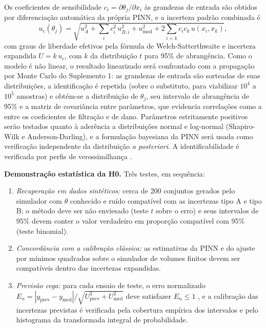 \documentclass[11pt,a4paper]{article}
\begin{document}
\noindent Os coeficientes de sensibilidade $c_i = \partial\theta_j/\partial x_i$ às grandezas de
entrada são obtidos por diferenciação automática da própria PINN, e a incerteza padrão
combinada é
\begin{equation}
u_c(\theta_j) = \sqrt{u_{A}^{2} + \sum_i c_i^{2}\,u_{B,i}^{2} + u_{\mathrm{mod}}^{2} + 2\sum_{i<k} c_i c_k\, u(x_i,x_k)},
\end{equation}
com graus de liberdade efetivos pela fórmula de Welch-Satterthwaite e incerteza expandida
$U = k\,u_c$, com $k$ da distribuição $t$ para 95\% de abrangência. Como o modelo é não
linear, o resultado linearizado será confrontado com a propagação por Monte Carlo do
Suplemento 1: as grandezas de entrada são sorteadas de suas distribuições, a
identificação é repetida (sobre o substituto, para viabilizar $10^4$ a $10^5$ amostras) e
obtém-se a distribuição de $\theta_j$, seu intervalo de abrangência de 95\% e a matriz de
covariância entre parâmetros, que evidencia correlações como a entre os coeficientes de
filtração e de dano. Parâmetros estritamente positivos serão testados quanto à aderência a
distribuições normal e log-normal (Shapiro-Wilk e Anderson-Darling), e a formulação
bayesiana da PINN \cite{yang2021bpinn} será usada como verificação independente da
distribuição \textit{a posteriori}. A identificabilidade é verificada por perfis de
verossimilhança \cite{raue2009}.

\textbf{Demonstração estatística da H0.} Três testes, em sequência:
\begin{enumerate}[label=(\roman*)]
  \item \textit{Recuperação em dados sintéticos:} cerca de 200 conjuntos gerados pelo simulador
        com $\theta$ conhecido e ruído compatível com as incertezas tipo A e tipo B; o
        método deve ser não enviesado (teste $t$ sobre o erro) e seus intervalos de 95\% devem
        conter o valor verdadeiro em proporção compatível com 95\% (teste binomial).
  \item \textit{Concordância com a calibração clássica:} as estimativas da PINN e do ajuste por
        mínimos quadrados sobre o simulador de volumes finitos devem ser compatíveis dentro
        das incertezas expandidas.
  \item \textit{Previsão cega:} para cada ensaio de teste, o erro normalizado
        $E_n = |y_{\mathrm{prev}} - y_{\mathrm{med}}| \big/ \sqrt{U_{\mathrm{prev}}^2 + U_{\mathrm{med}}^2}$
        deve satisfazer $E_n \le 1$ \cite{iso13528}, e a calibração das incertezas
        previstas é verificada pela cobertura empírica dos intervalos e pelo histograma da
        transformada integral de probabilidade.
\end{enumerate}
\end{document}

